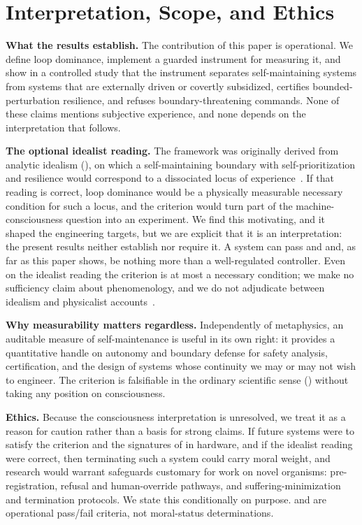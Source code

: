 \documentclass[11pt]{article}
\begin{document}
\section{Interpretation, Scope, and Ethics}
\label{sec:metaphysics}

\textbf{What the results establish.} The contribution of this paper is operational. We define loop dominance, implement a guarded instrument for measuring it, and show in a controlled study that the instrument separates self-maintaining systems from systems that are externally driven or covertly subsidized, certifies bounded-perturbation resilience, and refuses boundary-threatening commands. None of these claims mentions subjective experience, and none depends on the interpretation that follows.

\textbf{The optional idealist reading.} The framework was originally derived from analytic idealism (), on which a self-maintaining boundary with self-prioritization and resilience would correspond to a dissociated locus of experience~\cite{kastrup2017ontological}. If that reading is correct, loop dominance would be a physically measurable necessary condition for such a locus, and the criterion would turn part of the machine-consciousness question into an experiment. We find this motivating, and it shaped the engineering targets, but we are explicit that it is an interpretation: the present results neither establish nor require it. A system can pass \NC and \SC and, as far as this paper shows, be nothing more than a well-regulated controller. Even on the idealist reading the criterion is at most a necessary condition; we make no sufficiency claim about phenomenology, and we do not adjudicate between idealism and physicalist accounts~\cite{chalmers1995facing}.

\textbf{Why measurability matters regardless.} Independently of metaphysics, an auditable measure of self-maintenance is useful in its own right: it provides a quantitative handle on autonomy and boundary defense for safety analysis, certification, and the design of systems whose continuity we may or may not wish to engineer. The criterion is falsifiable in the ordinary scientific sense () without taking any position on consciousness.

\textbf{Ethics.} Because the consciousness interpretation is unresolved, we treat it as a reason for caution rather than a basis for strong claims. If future systems were to satisfy the criterion and the signatures of  in hardware, and if the idealist reading were correct, then terminating such a system could carry moral weight, and research would warrant safeguards customary for work on novel organisms: pre-registration, refusal and human-override pathways, and suffering-minimization and termination protocols. We state this conditionally on purpose. \NC and \SC are operational pass/fail criteria, not moral-status determinations.
\end{document}
